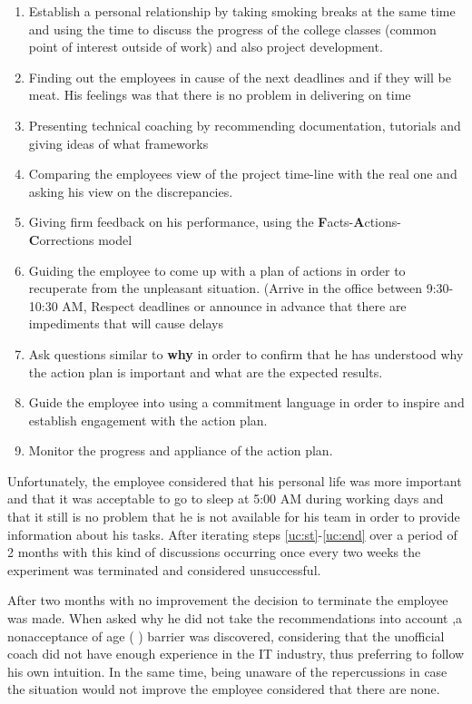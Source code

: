 \begin{enumerate}
\item Establish a personal relationship by taking smoking breaks at the same time and using the time to discuss the progress of the college classes (common point of interest outside of work) and also project development.
\item Finding out the employees in cause of the next deadlines and if they will be meat. His feelings was that there is no problem in delivering on time
\item\label{uc:st} Presenting technical coaching by recommending documentation, tutorials and giving ideas of what frameworks 
\item Comparing the employees view of the project time-line with the real one and asking his view on the discrepancies.
\item Giving firm feedback on his performance, using the \textbf{F}acts-\textbf{A}ctions-\textbf{C}orrections model \cite{abur-pm}
\item Guiding the employee to come up with a plan of actions in order to recuperate from the unpleasant situation. (Arrive in the office between 9:30-10:30 AM, Respect deadlines or announce in advance that there are impediments that will cause delays
\item Ask questions similar to \textbf{why} in order to confirm that he has understood why the action plan is important and what are the expected results.
\item\label{uc:end} Guide the employee into using a commitment language \cite{notes-to-a-software-team-leader} in order to inspire and establish engagement with the action plan.
\item Monitor the progress and appliance of the action plan.
\end{enumerate}

Unfortunately, the employee considered that his personal life was more important and that it was acceptable to go to sleep at 5:00 AM during working days and that it still is no problem that he is not available for his team in order to provide information about his tasks. After iterating steps \ref{uc:st}-\ref{uc:end} over a period of 2 months with this kind of discussions occurring once every two weeks the experiment was terminated and considered unsuccessful.

After two months with no improvement the decision to terminate the employee was made. When asked why he did not take the recommendations into account ,a nonacceptance of age ( ) barrier was discovered, considering that the unofficial coach did not have enough experience in the IT industry, thus preferring to follow his own intuition. In the same time, being unaware of the repercussions in case the situation would not improve the employee considered  that there are none.

